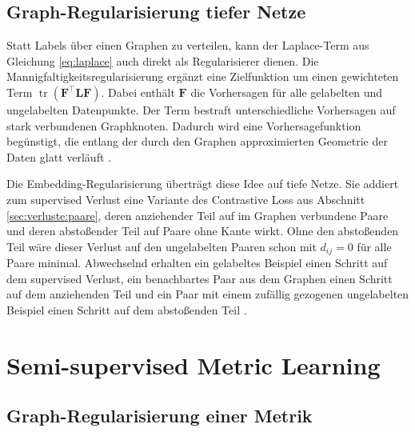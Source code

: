 \subsection{Graph-Regularisierung tiefer Netze}
\label{sec:weston}

Statt Labels über einen Graphen zu verteilen, kann der Laplace-Term aus Gleichung \eqref{eq:laplace} auch direkt als Regularisierer dienen. Die Mannigfaltigkeitsregularisierung ergänzt eine Zielfunktion um einen gewichteten Term $\operatorname{tr}(\bm{F}^{\top}\bm{L}\bm{F})$. Dabei enthält $\bm{F}$ die Vorhersagen für alle gelabelten und ungelabelten Datenpunkte. Der Term bestraft unterschiedliche Vorhersagen auf stark verbundenen Graphknoten. Dadurch wird eine Vorhersagefunktion begünstigt, die entlang der durch den Graphen approximierten Geometrie der Daten glatt verläuft \cite{belkin_manifold_2006}.

Die Embedding-Regularisierung überträgt diese Idee auf tiefe Netze. Sie addiert zum supervised Verlust eine Variante des Contrastive Loss aus Abschnitt \ref{sec:verluste:paare}, deren anziehender Teil auf im Graphen verbundene Paare und deren abstoßender Teil auf Paare ohne Kante wirkt. Ohne den abstoßenden Teil wäre dieser Verlust auf den ungelabelten Paaren schon mit $d_{ij}=0$ für alle Paare minimal. Abwechselnd erhalten ein gelabeltes Beispiel einen Schritt auf dem supervised Verlust, ein benachbartes Paar aus dem Graphen einen Schritt auf dem anziehenden Teil und ein Paar mit einem zufällig gezogenen ungelabelten Beispiel einen Schritt auf dem abstoßenden Teil \cite{weston_deep_2012}.

\section{Semi-supervised Metric Learning}
\label{sec:ssml}

\subsection{Graph-Regularisierung einer Metrik}
\label{sec:lrml}

